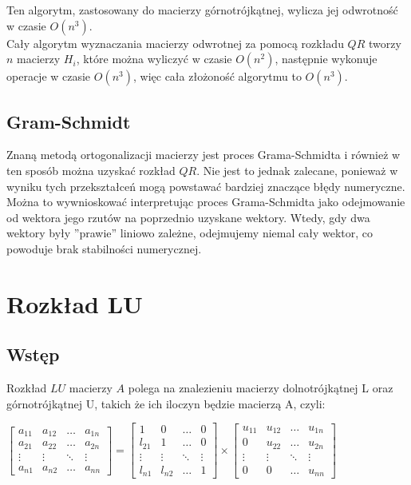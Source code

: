 \documentclass[11pt]{article}
\begin{document}
Ten algorytm, zastosowany do macierzy górnotrójkątnej, wylicza jej odwrotność w czasie $O(n^3)$.\\

Cały algorytm wyznaczania macierzy odwrotnej za pomocą rozkładu $QR$ tworzy $n$ macierzy $H_i$, 
które można wyliczyć w czasie $O(n^2)$, następnie wykonuje operacje w czasie $O(n^3)$,
więc cała złożoność algorytmu to $O(n^3)$.

\subsection{Gram-Schmidt}
Znaną metodą ortogonalizacji macierzy jest proces Grama-Schmidta i również w ten sposób można uzyskać rozkład $QR$.
Nie jest to jednak zalecane, ponieważ w wyniku tych przekształceń mogą powstawać bardziej znaczące błędy numeryczne.
Można to wywnioskować interpretując proces Grama-Schmidta jako odejmowanie od wektora jego rzutów na poprzednio
uzyskane wektory. Wtedy, gdy dwa wektory były ''prawie'' liniowo zależne, odejmujemy niemal cały wektor, co powoduje
brak stabilności numerycznej.\\ 

\section{Rozkład LU}
\subsection{Wstęp}
Rozkład $LU$ macierzy $A$ polega na znalezieniu macierzy dolnotrójkątnej L oraz górnotrójkątnej U, takich że ich iloczyn będzie macierzą A, czyli:
\begin{center}
\begin{math}
\begin{bmatrix}
    a_{11} & a_{12} & \dots  & a_{1n} \\
    a_{21} & a_{22} & \dots  & a_{2n} \\
    \vdots & \vdots & \ddots & \vdots \\
    a_{n1} & a_{n2} & \dots  & a_{nn}
\end{bmatrix}
=
\begin{bmatrix}
    1 & 0  & \dots  & 0 \\
    l_{21} & 1 & \dots  & 0 \\
    \vdots & \vdots & \ddots & \vdots \\
    l_{n1} & l_{n2} & \dots  & 1
\end{bmatrix}
\times
\begin{bmatrix}
    u_{11} & u_{12} & \dots  & u_{1n} \\
    0 & u_{22} & \dots  & u_{2n} \\
    \vdots & \vdots & \ddots & \vdots \\
    0 & 0 & \dots  & u_{nn}
\end{bmatrix}
\end{math}
\end{center}
\end{document}
